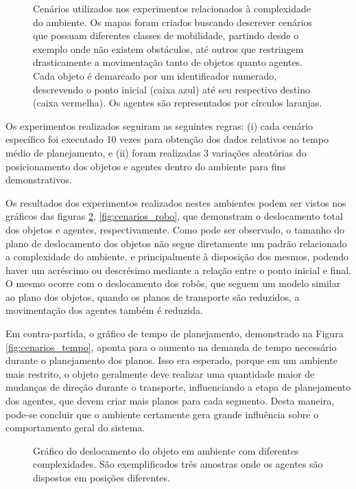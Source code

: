 \begin{figure}[h]
  \caption[Cenários utilizados nos experimentos relacionados à complexidade do ambiente]{Cenários utilizados nos experimentos relacionados à complexidade do ambiente. Os mapas foram criados buscando descrever cenários que possuam diferentes classes de mobilidade, partindo desde o exemplo onde não existem obstáculos, até outros que restringem drasticamente a movimentação tanto de objetos quanto agentes. Cada objeto é demarcado por um identificador numerado, descrevendo o ponto inicial (caixa azul) até seu respectivo destino (caixa vermelha). Os agentes são representados por círculos laranjas.}
  \label{fig:cenarios}
\end{figure}

Os experimentos realizados seguiram as seguintes regras: (i) cada cenário específico foi executado 10 vezes para obtenção dos dados relativos ao tempo médio de planejamento, e (ii) foram realizadas 3 variações aleatórias do posicionamento dos objetos e agentes dentro do ambiente para fins demonstrativos.

Os resultados dos experimentos realizados nestes ambientes podem ser vistos nos gráficos das figuras \ref{fig:cenarios_objeto}, \ref{fig:cenarios_robo}, que demonstram o deslocamento total dos objetos e agentes, respectivamente.
Como pode ser observado, o tamanho do plano de deslocamento dos objetos não segue diretamente um padrão relacionado a complexidade do ambiente, e principalmente à disposição dos mesmos, podendo haver um acréscimo ou descrésimo mediante a relação entre o ponto inicial e final.
O mesmo ocorre com o deslocamento dos robôs, que seguem um modelo similar ao plano dos objetos, quando os planos de transporte são reduzidos, a movimentação dos agentes também é reduzida.

Em contra-partida, o gráfico de tempo de planejamento, demonstrado na Figura \ref{fig:cenarios_tempo}, aponta para o aumento na demanda de tempo necessário durante o planejamento dos planos. Isso era esperado, porque em um ambiente mais restrito, o objeto geralmente deve realizar uma quantidade maior de mudanças de direção durante o transporte, influenciando a etapa de planejamento dos agentes, que devem criar mais planos para cada segmento.
Desta maneira, pode-se concluir que o ambiente certamente gera grande influência sobre o comportamento geral do sistema.

\begin{figure}[h]
  \centering
  \setlength{\fboxsep}{0pt}
  \caption{Gráfico do deslocamento do objeto em ambiente com diferentes complexidades. São exemplificados três amostras onde os agentes são dispostos em posições diferentes.}
  \label{fig:cenarios_objeto}
\end{figure}

